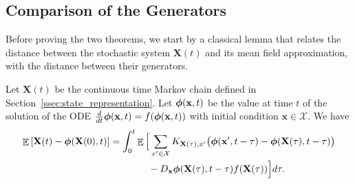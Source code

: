 \documentclass[acmsmall]{acmart}
\newcommand\bx{\mathbf{x}}
\newcommand\bX{\mathbf{X}}
\newcommand\bphi{\text{\boldmath$\phi$}}
\newcommand\calX{\mathcal{X}}
\newcommand{\R}{\ensuremath{\mathbb{R}}}
\DeclareMathOperator{\E}{\mathbb{E}} %
\newcommand\esp[1]{\E\left[#1\right]} %
\newcommand\conv[1]{\mathrm{conv}(#1)}      %
\begin{document}

\subsection{Comparison of the Generators}
\label{sec:proof_lemma}

Before proving the two theorems, we start by a classical lemma that relates the distance between the stochastic system $\bX(t)$ and its mean field approximation, with the distance between their generators.
\begin{lemma}
  \label{lemma:generator_comparison}
  Let $\bX(t)$ be the continuous time Markov chain defined in Section~\ref{ssec:state_representation}. Let $\bphi(\bx, t)$ be the value at time $t$ of the solution of the ODE $\frac{d}{dt}\bphi(\bx, t) = f(\bphi(\bx, t))$ with initial condition $\bx\in\calX$. We have
  \begin{align*}
  \esp {\bX(t) - \bphi(\bX(0),t)} & = \int_0^t \E\Big[ \sum_{x'\in \calX} K_{\bX(\tau),x'} \bigl( \bphi(\bx',t-\tau) -  \bphi(\bX(\tau),t-\tau) \bigr) \\
  & \qquad\qquad - D_\bx \bphi(\bX(\tau),t-\tau)f(\bX(\tau)) \Big] d\tau.
  \end{align*}
  \end{lemma}
  
\end{document}
